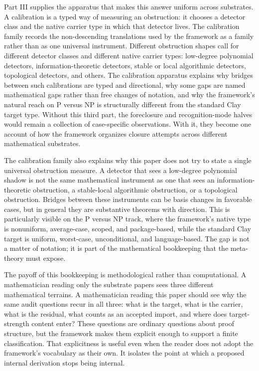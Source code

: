 \documentclass[11pt]{article}
\theoremstyle{definition}
\begin{document}
Part III supplies the apparatus that makes this answer uniform across
substrates.  A calibration is a typed way of measuring an obstruction:
it chooses a detector class and the native carrier type in which that
detector lives.  The calibration family records the non-descending
translations used by the framework as a family rather than as one
universal instrument.  Different obstruction shapes call for
different detector classes and different native carrier types:
low-degree polynomial detectors, information-theoretic detectors,
stable or local algorithmic detectors, topological detectors, and
others.  The calibration apparatus explains why bridges between such
calibrations are typed and directional, why some gaps are named
mathematical gaps rather than free changes of notation, and why the
framework's natural reach on P versus NP is structurally different
from the standard Clay target type.  Without this third part, the
foreclosure and recognition-mode halves would remain a collection of
case-specific observations.  With it, they become one account of how
the framework organizes closure attempts across different
mathematical substrates.

The calibration family also explains why this paper does not try to
state a single universal obstruction measure.  A detector that sees a
low-degree polynomial shadow is not the same mathematical instrument
as one that sees an information-theoretic obstruction, a stable-local
algorithmic obstruction, or a topological obstruction.  Bridges
between these instruments can be basis changes in favorable cases,
but in general they are substantive theorems with direction.  This is
particularly visible on the P versus NP track, where the framework's
native type is nonuniform, average-case, scoped, and package-based,
while the standard Clay target is uniform, worst-case,
unconditional, and language-based.  The gap is not a matter of
notation; it is part of the mathematical bookkeeping that the
meta-theory must expose.

The payoff of this bookkeeping is methodological rather than
computational.  A mathematician reading only the substrate papers sees
three different mathematical terrains.  A mathematician reading this
paper should see why the same audit questions recur in all three:
what is the target, what is the carrier, what is the residual, what
counts as an accepted import, and where does target-strength content
enter?  These questions are ordinary questions about proof structure,
but the framework makes them explicit enough to support a finite
classification.  That explicitness is useful even when the reader does
not adopt the framework's vocabulary as their own.  It isolates the
point at which a proposed internal derivation stops being internal.
\end{document}
